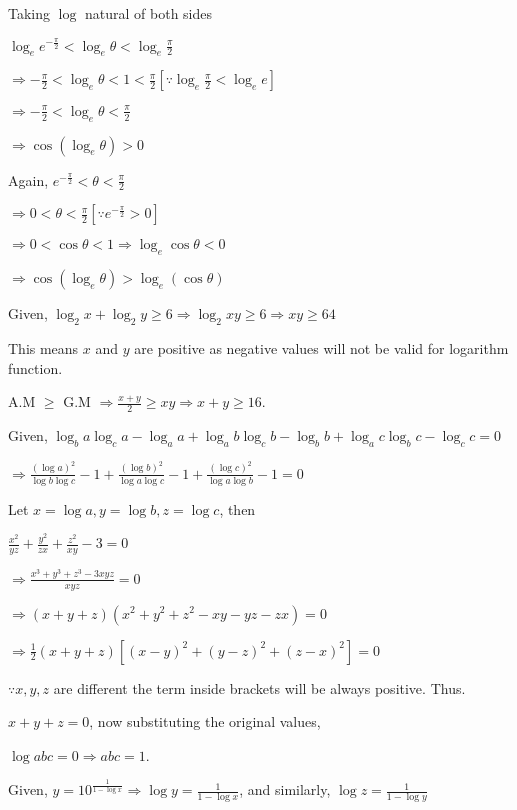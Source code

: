   Taking $\log$ natural of both sides

  $\log_ee^{-\tfrac{\pi}{2}} < \log_e\theta < \log_e\frac{\pi}{2}$

  $\Rightarrow -\frac{\pi}{2} < \log_e\theta < 1 < \frac{\pi}{2}\left[\because \log_e\tfrac{\pi}{2} < \log_ee\right]$

  $\Rightarrow -\frac{\pi}{2} < \log_e\theta < \frac{\pi}{2}$

  $\Rightarrow \cos(\log_e\theta) > 0$

  Again, $e^{-\tfrac{\pi}{2}} < \theta < \frac{\pi}{2}$

  $\Rightarrow 0 < \theta <\frac{\pi}{2} [\because e^{-\tfrac{\pi}{2}} > 0]$

  $\Rightarrow 0 < \cos\theta < 1 \Rightarrow \log_e\cos\theta < 0$

  $\Rightarrow \cos(\log_e\theta) > \log_e(\cos\theta)$
\item Given, $\log_2x + \log_2y \geq 6\Rightarrow \log_2xy \geq 6 \Rightarrow xy \geq 64$

  This means $x$ and $y$ are positive as negative values will not be valid for logarithm function.

  A.M $\geq$ G.M $\Rightarrow \frac{x + y}{2} \geq xy \Rightarrow x + y \geq 16$.
\item Given, $\log_ba\log_ca - \log_aa + \log_ab\log_cb - \log_bb + \log_ac\log_bc - \log_cc = 0$

  $\Rightarrow \frac{(\log a)^2}{\log b\log c} - 1 + \frac{(\log b)^2}{\log a\log c} - 1 + \frac{(\log c)^2}{\log a\log b} - 1 =0$

  Let $x = \log a, y = \log b, z = \log c$, then

  $\frac{x^2}{yz} + \frac{y^2}{zx} + \frac{z^2}{xy} - 3 = 0$

  $\Rightarrow \frac{x^3 + y^3 + z^3 - 3xyz}{xyz} = 0$

  $\Rightarrow (x + y + z)(x^2 + y^2 + z^2 - xy - yz - zx) = 0$

  $\Rightarrow \frac{1}{2}(x + y + z)[(x - y)^2 + (y - z)^2 + (z - x)^2] = 0$

  $\because x, y, z$ are different the term inside brackets will be always positive. Thus.

  $x + y + z = 0$, now substituting the original values,

  $\log abc = 0 \Rightarrow abc = 1$.
\item Given, $y = 10^{\frac{1}{1 - \log x}} \Rightarrow \log y = \frac{1}{1 - \log x}$, and similarly, $\log z = \frac{1}{1 - \log y}$

